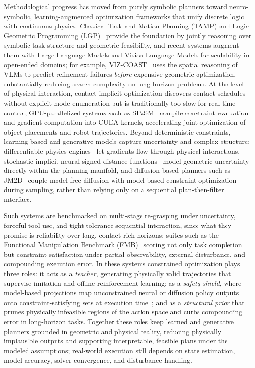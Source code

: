 Methodological progress has moved from purely symbolic planners toward neuro-symbolic, learning-augmented optimization frameworks that unify discrete logic with continuous physics. Classical Task and Motion Planning (TAMP) and Logic-Geometric Programming (LGP)~\cite{toussaint2015lgp} provide the foundation by jointly reasoning over symbolic task structure and geometric feasibility, and recent systems augment them with Large Language Models and Vision-Language Models for scalability in open-ended domains; for example, VIZ-COAST~\cite{yan2025vizcoast} uses the spatial reasoning of VLMs to predict refinement failures \emph{before} expensive geometric optimization, substantially reducing search complexity on long-horizon problems. At the level of physical interaction, contact-implicit optimization discovers contact schedules without explicit mode enumeration but is traditionally too slow for real-time control; GPU-parallelized systems such as SPaSM~\cite{chen2025spasm} compile constraint evaluation and gradient computation into CUDA kernels, accelerating joint optimization of object placements and robot trajectories. Beyond deterministic constraints, learning-based and generative models capture uncertainty and complex structure: differentiable physics engines~\cite{freeman2021brax} let gradients flow through physical interactions, stochastic implicit neural signed distance functions~\cite{quintero2024stochastic} model geometric uncertainty directly within the planning manifold, and diffusion-based planners such as JM2D~\cite{jung2025joint} couple model-free diffusion with model-based constraint optimization during sampling, rather than relying only on a sequential plan-then-filter interface.

Such systems are benchmarked on multi-stage re-grasping under uncertainty, forceful tool use, and tight-tolerance sequential interaction, since what they promise is reliability over long, contact-rich horizons; suites such as the Functional Manipulation Benchmark (FMB)~\cite{fmb2023} scoring not only task completion but constraint satisfaction under partial observability, external disturbance, and compounding execution error. In these systems constrained optimization plays three roles: it acts as a \textit{teacher}, generating physically valid trajectories that supervise imitation and offline reinforcement learning; as a \textit{safety shield}, where model-based projections map unconstrained neural or diffusion policy outputs onto constraint-satisfying sets at execution time~\cite{römer2025diffusionpredictivecontrolconstraints}; and as a \textit{structural prior} that prunes physically infeasible regions of the action space and curbs compounding error in long-horizon tasks. Together these roles keep learned and generative planners grounded in geometric and physical reality, reducing physically implausible outputs and supporting interpretable, feasible plans under the modeled assumptions; real-world execution still depends on state estimation, model accuracy, solver convergence, and disturbance handling.

